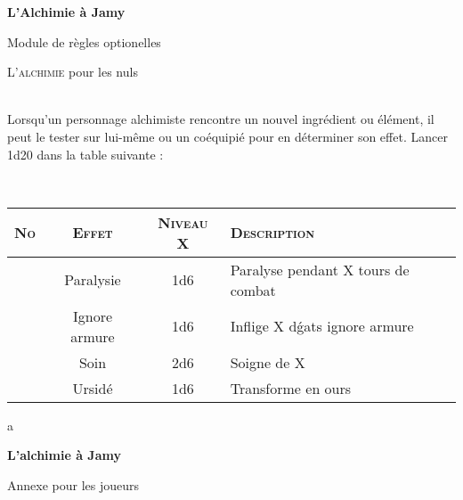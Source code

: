 \documentclass[11pt]{article} %
\newcommand{\enluminure}[2]{\lettrine[lines=3]{\small \initfamily #1}{#2}}
\newcommand{\scbf}[1]{\textsc{\textbf{#1}}}
\newcounter{NoCounter}
\newcommand{\myline}[3]{
    \stepcounter{NoCounter}
    \arabic{NoCounter} & #1 & #2 & #3\\
}
\newcommand{\myjump}[1][1]{\mbox{}\\[#1cm]}
\begin{document}
\pagestyle{empty}

\begin{center}
    \textbf{L'Alchimie à Jamy}

    Module de règles optionelles
\end{center}

\enluminure{L}{'alchimie} pour les nuls


\myjump
Lorsqu'un personnage alchimiste rencontre un nouvel ingrédient ou élément, il peut le tester sur lui-même ou un coéquipié pour en déterminer son effet. Lancer 1d20 dans la table suivante :\newline

\myjump[0]
\begin{tabularx}{\linewidth}{|c|c|c|X|}
\hline

    \scbf{No} & \scbf{Effet} & \scbf{Niveau X} & \scbf{Description}\\\hline

    \myline{Paralysie}{1d6}{Paralyse pendant X tours de combat}

    \myline{Ignore armure}{1d6}{Inflige X dǵats ignore armure}

    \myline{Soin}{2d6}{Soigne de X}

    \myline{Ursidé}{1d6}{Transforme en ours}

\hline
\end{tabularx}



\newpage
a



\newpage
{}
\begin{center}
    \textbf{L'alchimie à Jamy}

    Annexe pour les joueurs
\end{center}
\end{document}
